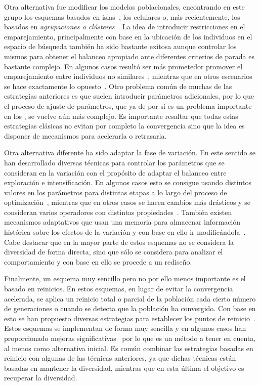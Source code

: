 Otra alternativa fue modificar los modelos poblacionales, encontrando en este grupo los esquemas basados en islas~\cite{alba2005parallel}, los celulares
o, más recientemente, los basados en \textit{agrupaciones o clústeres}~\cite{gao2014cluster}.
%
La idea de introducir restricciones en el emparejamiento, principalmente con base en la ubicación de los individuos en el espacio de búsqueda también
ha sido bastante exitosa aunque controlar los mismos para obtener el balanceo apropiado ante diferentes criterios de parada
es bastante complejo.
%
En algunos casos resultó ser más prometedor promover el emparejamiento entre individuos no similares~\cite{Joel:CHC}, mientras que en otros escenarios 
se hace exactamente lo opuesto~\cite{deb1989investigation}.
%
Otro problema común de muchas de las estrategias anteriores es que suelen introducir parámetros adicionales, por lo que el proceso de ajuste de parámetros, que ya de por sí
es un problema importante en los \EAS{}, se vuelve aún más complejo.
%
Es importante resaltar que todas estas estrategias clásicas no evitan por completo la convergencia sino que la idea es disponer de mecanismos para acelerarla o retrasarla.

Otra alternativa diferente ha sido adaptar la fase de variación.
%
En este sentido se han desarrollado diversas técnicas para controlar los parámetros que se consideran en la variación con el propósito de 
adaptar el balanceo entre exploración e intensificación.
%
En algunos casos esto se consigue usando distintos valores en los parámetros para distintas etapas a lo largo del proceso de optimización~\cite{yu2014differential},
mientras que en otros casos se hacen cambios más drásticos y se consideran varios operadores con distintas propiedades~\cite{lobo2007parameter}.
%
También existen mecanismos adaptativos que usan una memoria para almacenar información histórica sobre los efectos de la variación
y con base en ello ir modificándola~\cite{yuen2009genetic}.
%
Cabe destacar que en la mayor parte de estos esquemas no se considera la diversidad de forma directa, sino que sólo se considera para analizar el comportamiento
y con base en ello se procede a un rediseño.

Finalmente, un esquema muy sencillo pero no por ello menos importante es el basado en reinicios.
%
En estos esquemas, en lugar de evitar la convergencia acelerada, se aplica un reinicio total o parcial de la población cada cierto número de
generaciones o cuando se detecta que la población ha convergido.
%
Con base en esto se han propuesto diversas estrategias para establecer los puntos de reinicio~\cite{jansen2002analysis}.
%
Estos esquemas se implementan de forma muy sencilla y en algunos casos han proporcionado mejoras significativas~\cite{koumousis2006saw} por lo que
es un método a tener en cuenta, al menos como alternativa inicial.
%
Es común combinar las estrategias basadas en reinicio con algunas de las técnicas anteriores, ya que dichas técnicas están basadas en mantener
la diversidad, mientras que en esta última el objetivo es recuperar la diversidad.

